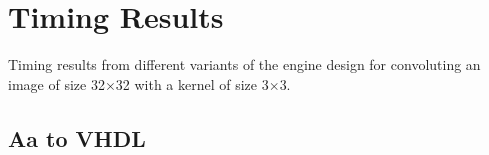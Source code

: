 
\section{Timing Results}

Timing results from different variants of the engine design for convoluting an image of size 32$\times$32 with a kernel of size
3$\times$3. 

%
%
%
%
%
%

\subsection*{Aa to VHDL}


